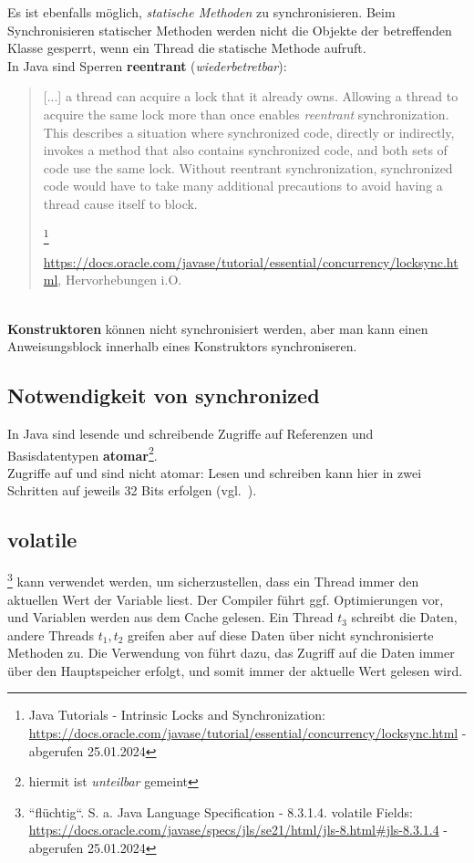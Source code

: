 Es ist ebenfalls möglich, \textit{statische Methoden} zu synchronisieren.
Beim Synchronisieren statischer Methoden werden nicht die Objekte der betreffenden Klasse gesperrt, wenn ein Thread die statische Methode aufruft.\\

In Java sind Sperren \textbf{reentrant} (\textit{wiederbetretbar}):

\blockquote[\url{https://docs.oracle.com/javase/tutorial/essential/concurrency/locksync.html}, Hervorhebungen i.O.]{
     [...] a thread can acquire a lock that it already owns. Allowing a thread to acquire the same lock more than once enables \textit{reentrant} synchronization. This describes a situation where synchronized code, directly or indirectly, invokes a method that also contains synchronized code, and both sets of code use the same lock. Without reentrant synchronization, synchronized code would have to take many additional precautions to avoid having a thread cause itself to block.

\footnote{
Java Tutorials - Intrinsic Locks and Synchronization: \url{https://docs.oracle.com/javase/tutorial/essential/concurrency/locksync.html} - abgerufen 25.01.2024
}
}\\

\textbf{Konstruktoren} können nicht synchronisiert werden, aber man kann einen Anweisungsblock innerhalb eines Konstruktors synchroniseren.

\subsection*{Notwendigkeit von synchronized}

In Java sind lesende und schreibende Zugriffe auf Referenzen und Basisdatentypen \textbf{atomar}\footnote{
hiermit ist \textit{unteilbar} gemeint
}.\\

Zugriffe auf  und  sind nicht atomar: Lesen und schreiben kann hier in zwei Schritten auf jeweils 32 Bits erfolgen (vgl.~\cite[30]{Oec22}).\\

\subsection*{volatile}
\footnote{``flüchtig``.
S. a. Java Language Specification - 8.3.1.4. volatile Fields: \url{https://docs.oracle.com/javase/specs/jls/se21/html/jls-8.html#jls-8.3.1.4} - abgerufen 25.01.2024
} kann verwendet werden, um sicherzustellen, dass ein Thread immer den aktuellen Wert der Variable liest.
Der Compiler führt ggf. Optimierungen vor, und Variablen werden aus dem Cache gelesen.
Ein Thread $t_3$ schreibt die Daten, andere Threads $t_1, t_2$ greifen aber auf diese Daten über nicht synchronisierte Methoden zu.
Die Verwendung von  führt dazu, das Zugriff auf die Daten immer über den Hauptspeicher erfolgt, und somit immer der aktuelle Wert gelesen wird.

